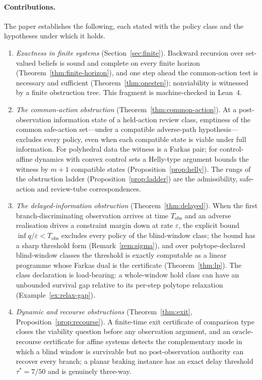 \documentclass[11pt,a4paper]{article}
\theoremstyle{plain}
\theoremstyle{definition}
\theoremstyle{remark}
\newcommand{\Tobs}{T_{\mathrm{obs}}}
\begin{document}
\paragraph{Contributions.} The paper establishes the following, each stated with the policy class and the hypotheses under which it holds.
\begin{enumerate}[leftmargin=2em,itemsep=2pt]
\item \emph{Exactness in finite systems} (Section~\ref{sec:finite}). Backward recursion over set-valued beliefs is sound and complete on every finite horizon (Theorem~\ref{thm:finite-horizon}), and one step ahead the common-action test is necessary and sufficient (Theorem~\ref{thm:onestep}); nonviability is witnessed by a finite obstruction tree. This fragment is machine-checked in Lean~4.
\item \emph{The common-action obstruction} (Theorem~\ref{thm:common-action}). At a post-observation information state of a held-action review class, emptiness of the common safe-action set---under a compatible adverse-path hypothesis---excludes every policy, even when each compatible state is viable under full information. For polyhedral data the witness is a Farkas pair; for control-affine dynamics with convex control sets a Helly-type argument bounds the witness by $m+1$ compatible states (Proposition~\ref{prop:helly}). The rungs of the obstruction ladder (Proposition~\ref{prop:ladder}) are the admissibility, safe-action and review-tube correspondences.
\item \emph{The delayed-information obstruction} (Theorem~\ref{thm:delayed}). When the first branch-discriminating observation arrives at time $\Tobs$ and an adverse realisation drives a constraint margin down at rate $\varepsilon$, the explicit bound $\inf q/\varepsilon<\Tobs$ excludes every policy of the blind-window class; the bound has a sharp threshold form (Remark~\ref{rem:sigma}), and over polytope-declared blind-window classes the threshold is exactly computable as a linear programme whose Farkas dual is the certificate (Theorem~\ref{thm:lp}). The class declaration is load-bearing: a whole-window hold class can have an unbounded survival gap relative to its per-step polytope relaxation (Example~\ref{ex:relax-gap}).
\item \emph{Dynamic and recourse obstructions} (Theorem~\ref{thm:exit}, Proposition~\ref{prop:recourse}). A finite-time exit certificate of comparison type closes the viability question before any observation argument, and an oracle-recourse certificate for affine systems detects the complementary mode in which a blind window is survivable but no post-observation authority can recover every branch; a planar braking instance has an exact delay threshold $\tau^*=7/50$ and is genuinely three-way.

\end{enumerate}
\end{document}
